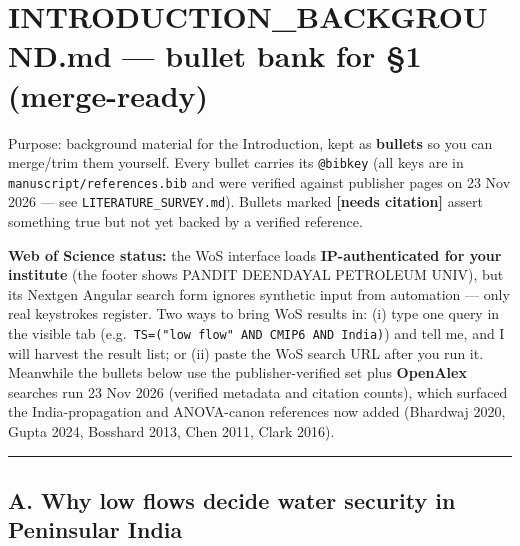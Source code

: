 \documentclass[
  11pt,
]{article}
\author{}
\date{}
\begin{document}
\section{INTRODUCTION\_BACKGROUND.md --- bullet bank for §1
(merge-ready)}\label{introduction_background.md-bullet-bank-for-1-merge-ready}

Purpose: background material for the Introduction, kept as
\textbf{bullets} so you can merge/trim them yourself. Every bullet
carries its \texttt{@bibkey} (all keys are in
\texttt{manuscript/references.bib} and were verified against publisher
pages on 23 Nov 2026 --- see \texttt{LITERATURE\_SURVEY.md}). Bullets
marked \textbf{{[}needs citation{]}} assert something true but not yet
backed by a verified reference.

\textbf{Web of Science status:} the WoS interface loads
\textbf{IP-authenticated for your institute} (the footer shows PANDIT
DEENDAYAL PETROLEUM UNIV), but its Nextgen Angular search form ignores
synthetic input from automation --- only real keystrokes register. Two
ways to bring WoS results in: (i) type one query in the visible tab
(e.g.~\texttt{TS=("low\ flow"\ AND\ CMIP6\ AND\ India)}) and tell me,
and I will harvest the result list; or (ii) paste the WoS search URL
after you run it. Meanwhile the bullets below use the publisher-verified
set plus \textbf{OpenAlex} searches run 23 Nov 2026 (verified metadata
and citation counts), which surfaced the India-propagation and
ANOVA-canon references now added (Bhardwaj 2020, Gupta 2024, Bosshard
2013, Chen 2011, Clark 2016).

\begin{center}\rule{0.5\linewidth}{0.5pt}\end{center}

\subsection{A. Why low flows decide water security in Peninsular
India}\label{a.-why-low-flows-decide-water-security-in-peninsular-india}
\end{document}
